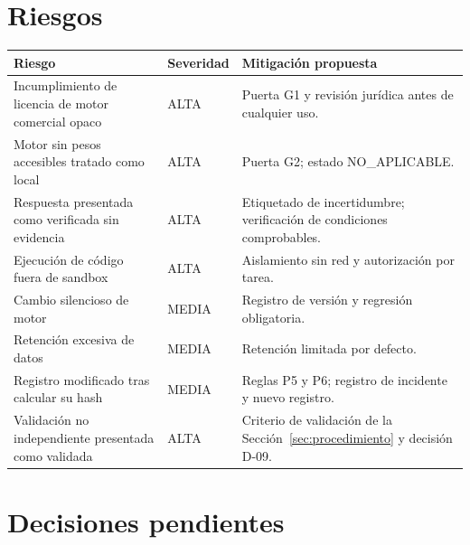 \documentclass[12pt]{article}
\begin{document}
\section{Riesgos}

\begin{longtable}{|p{3.8cm}|p{1.9cm}|p{7.8cm}|}
\hline
\textbf{Riesgo} & \textbf{Severidad} & \textbf{Mitigación propuesta} \\
\hline
\endhead
Incumplimiento de licencia de motor comercial opaco & ALTA & Puerta G1 y revisión jurídica antes de cualquier uso. \\
\hline
Motor sin pesos accesibles tratado como local & ALTA & Puerta G2; estado NO\_APLICABLE. \\
\hline
Respuesta presentada como verificada sin evidencia & ALTA & Etiquetado de incertidumbre; verificación de condiciones comprobables. \\
\hline
Ejecución de código fuera de sandbox & ALTA & Aislamiento sin red y autorización por tarea. \\
\hline
Cambio silencioso de motor & MEDIA & Registro de versión y regresión obligatoria. \\
\hline
Retención excesiva de datos & MEDIA & Retención limitada por defecto. \\
\hline
Registro modificado tras calcular su hash & MEDIA & Reglas P5 y P6; registro de incidente y nuevo registro. \\
\hline
Validación no independiente presentada como validada & ALTA & Criterio de validación de la Sección~\ref{sec:procedimiento} y decisión D-09. \\
\hline
\end{longtable}

\section{Decisiones pendientes}
\end{document}
